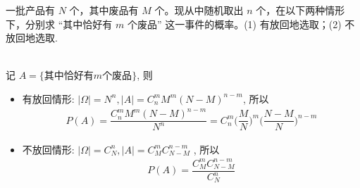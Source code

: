 \documentclass[Prob-All.tex]{subfiles}
\begin{document}
	\begin{frame}
		\begin{exam}
			一批产品有 $N$ 个，其中废品有 $M$ 个。现从中随机取出 $n$ 个，在以下两种情形下，分别求 “其中恰好有 $m$ 个废品” 这一事件的概率。(1) 有放回地选取；(2) 不放回地选取.
		\end{exam}
		\\
		\pause \jieda 记 $A = \{\mbox{其中恰好有} m \mbox{个废品}\}$, 则
		\begin{itemize}[<+-|alert@+>]
			\item  有放回情形: $|\Omega| = N^n, |A| = C_n^mM^m (N − M)^{n−m}$, 所以
			\begin{eqnarray*}
				P(A)=\dfrac{C_n^mM^m(N − M)^{n−m}}{N^n}=C_n^m\big(\dfrac{M}{N}\big)^m\big(\dfrac{N-M}{N}\big)^{n-m}
			\end{eqnarray*}
			\item 不放回情形: $|\Omega|=C_N^n, |A|=C_M^mC_{N-M}^{n−m}$ , 所以
			\begin{eqnarray*}
				P(A)=\dfrac{C_M^mC_{N-M}^{n−m}}{C_N^n}
			\end{eqnarray*}


		\end{itemize}

	\end{frame}

\end{document}
